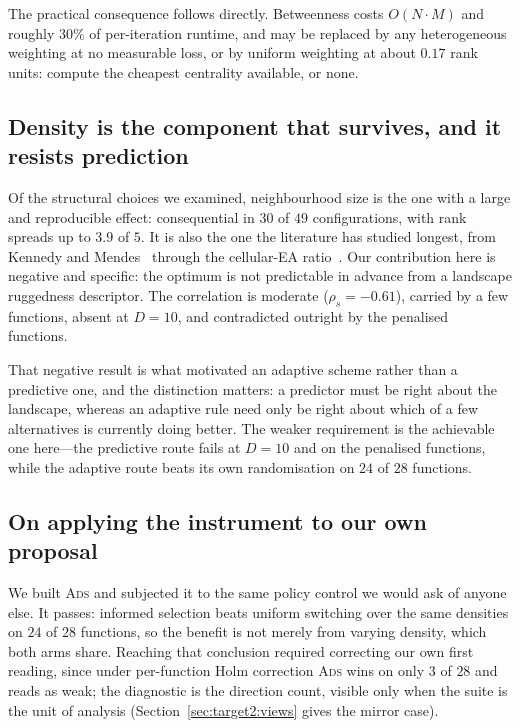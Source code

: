 The practical consequence follows directly. Betweenness costs
$O(N\!\cdot\!M)$ and roughly $30\%$ of per-iteration runtime, and may be
replaced by any heterogeneous weighting at no measurable loss, or by uniform
weighting at about $0.17$ rank units: compute the cheapest centrality
available, or none.

\subsection{Density is the component that survives, and it resists prediction}

Of the structural choices we examined, neighbourhood size is the one with a
large and reproducible effect: consequential in $30$ of $49$ configurations,
with rank spreads up to $3.9$ of $5$. It is also the one the literature has
studied longest, from Kennedy and Mendes~\cite{kennedy2002population} through
the cellular-EA ratio~\cite{alba2005exploration}. Our contribution here is
negative and specific: the optimum is not predictable in advance from a
landscape ruggedness descriptor. The correlation is moderate
($\rho_{s}=-0.61$), carried by a few functions, absent at $D=10$, and
contradicted outright by the penalised functions.

That negative result is what motivated an adaptive scheme rather than a
predictive one, and the distinction matters: a predictor must be right about
the landscape, whereas an adaptive rule need only be right about which of a few
alternatives is currently doing better. The weaker requirement is the
achievable one here---the predictive route fails at $D=10$ and on the penalised
functions, while the adaptive route beats its own randomisation on $24$ of $28$
functions.

\subsection{On applying the instrument to our own proposal}

We built \textsc{Ads} and subjected it to the same policy control we would ask
of anyone else. It passes: informed selection beats uniform switching over the
same densities on $24$ of $28$ functions, so the benefit is not merely from
varying density, which both arms share. Reaching that conclusion required
correcting our own first reading, since under per-function Holm correction
\textsc{Ads} wins on only $3$ of $28$ and reads as weak; the diagnostic is the
direction count, visible only when the suite is the unit of analysis
(Section~\ref{sec:target2:views} gives the mirror case).

